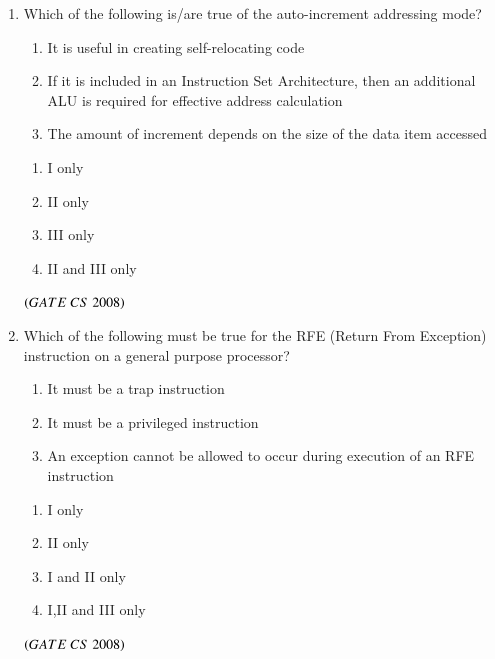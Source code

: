 \documentclass[journal, onecolumn]{IEEEtran}
\numberwithin{equation}{enumi}
\numberwithin{figure}{enumi}
\begin{document}
\begin{enumerate}
\item Which of the following is/are true of the auto-increment addressing mode? 
\begin{enumerate} [label=\Roman*.]
   \item It is useful in creating self-relocating code
   \item  If it is included in an Instruction Set Architecture, then an additional ALU is required for effective address calculation
   \item The amount of increment depends on the size of the data item accessed 
\end{enumerate}
\vspace{-1em}%
\begin{multicols}{4}
\begin{enumerate}
\item  I only
\item  II only
 \item III only
 \item II and III only 
 \end{enumerate}
\end{multicols}
\hfill $\left(GATE\ CS\  2008\right)$

\item Which of the following must be true for the RFE (Return From Exception) instruction on a general purpose processor?
\begin{enumerate} [label=\Roman*.]
   \item It must be a trap instruction
   \item It must be a privileged instruction
   \item An exception cannot be allowed to occur during execution of an RFE instruction
\end{enumerate}
\begin{multicols}{2}
\begin{enumerate}
   \item  I only
   \item  II only
   \item I and II  only
   \item I,II and III only 
\end{enumerate}
\end{multicols}
\hfill $\left(GATE\ CS\  2008\right)$


\end{enumerate}
\end{document}
